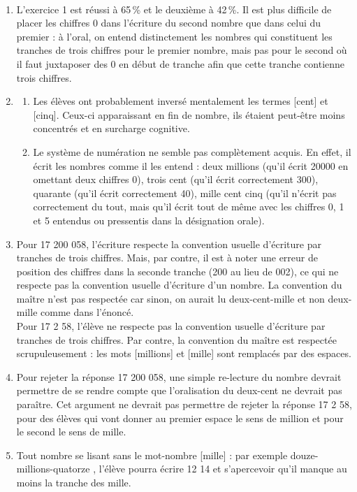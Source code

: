 \begin{corrige}
\ \\ [-5mm]
\begin{enumerate}
   \item L'exercice 1 est réussi à 65\,\% et le deuxième à 42\,\%. Il est plus difficile de placer les chiffres 0 dans l'écriture du second nombre que dans celui du premier : à l'oral, on entend distinctement les nombres qui constituent les tranches de trois chiffres pour le premier nombre, mais pas pour le second où il faut juxtaposer des 0 en début de tranche afin que cette tranche contienne trois chiffres.
   \item 
   \begin{enumerate}
      \item Les élèves ont probablement inversé mentalement les termes [cent] et [cinq]. Ceux-ci apparaissant en fin de nombre, ils étaient peut-être moins concentrés et en surcharge cognitive.
      \item Le système de  numération ne semble pas complètement acquis. En effet, il écrit les nombres \og comme il les entend \fg{} : deux millions (qu'il écrit 20000 en omettant deux chiffres 0), trois cent (qu'il écrit correctement 300), quarante (qu'il écrit correctement 40), mille cent cinq (qu'il n'écrit pas correctement du tout, mais qu'il écrit tout de même avec les chiffres 0, 1 et 5 entendus ou pressentis dans la désignation orale).
   \end{enumerate}
   \item Pour 17 200 058, l'écriture respecte la convention usuelle d'écriture par tranches de trois chiffres. Mais, par contre, il est à noter une erreur de position des chiffres dans la seconde tranche (200 au lieu de 002), ce qui ne respecte pas la convention usuelle d'écriture d'un nombre. La convention du maître n'est pas respectée car sinon, on aurait lu \og deux-cent-mille \fg{} et non \og deux-mille \fg{} comme dans l'énoncé. \\
   Pour 17 2 58, l'élève ne respecte pas la convention usuelle d'écriture par tranches de trois chiffres. Par contre, la convention du maître est respectée scrupuleusement : les mots [millions] et [mille] sont remplacés par des espaces.
   \item Pour rejeter la réponse 17 200 058, une simple re-lecture du nombre devrait permettre de se rendre compte que l'oralisation du \og deux-cent \fg{} ne devrait pas paraître. Cet argument ne devrait pas permettre de rejeter la réponse 17 2 58, pour des élèves qui vont donner au premier espace le sens de million et pour le second le sens de mille.
   \item Tout nombre se lisant sans le mot-nombre [mille] : par exemple \og douze-millions-quatorze \fg{}, l'élève pourra écrire 12 14 et s'apercevoir qu'il manque au moins la tranche des mille.
\end{enumerate}
\end{corrige}

